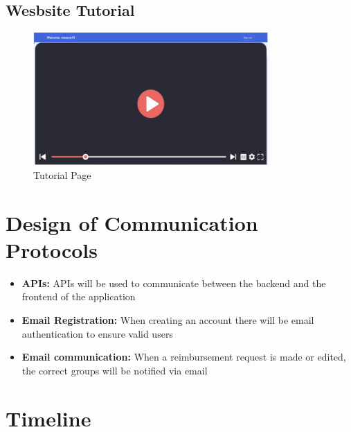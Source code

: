 \documentclass[12pt, titlepage]{article}
\begin{document}
\subsection{Wesbsite Tutorial}
\begin{figure}[H]
    \centering
    \includegraphics[width=0.8\textwidth]{img/tutorial.png}
    \caption{Tutorial Page}
    \label{fig:tutorial}
\end{figure}

\section{Design of Communication Protocols}

\begin{itemize}
  \item \textbf{APIs:} APIs will be used to communicate between the backend and the frontend of the application 
  \item \textbf{Email Registration:} When creating an account there will be email authentication to ensure valid users
  \item \textbf{Email communication:} When a reimbursement request is made or edited, the correct groups will be notified via email
\end{itemize}
\section{Timeline}
\end{document}
